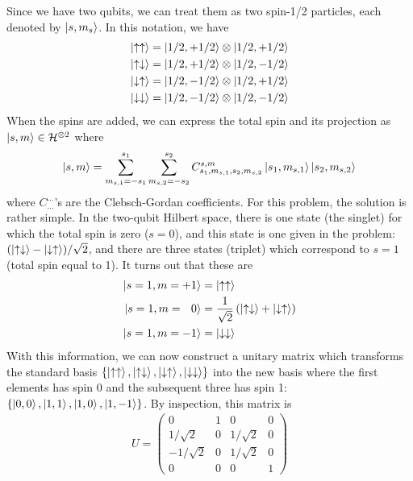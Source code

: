 \documentclass{article}
\theoremstyle{definition}
\newcommand{\f}[2]{\frac{#1}{#2}}
\newcommand{\lp}{\left(}
\newcommand{\rp}{\right)}
\begin{document}
Since we have two qubits, we can treat them as two spin-1/2 particles, each denoted by $\ket{s,m_s}$. In this notation, we have
\begin{align*}
	\ket{\uparrow\uparrow} &= \ket{1/2,+1/2} \otimes \ket{1/2,+1/2}\\
	\ket{\uparrow\downarrow} &= \ket{1/2,+1/2} \otimes \ket{1/2,-1/2}\\
	\ket{\downarrow\uparrow} &= \ket{1/2,-1/2}\otimes \ket{1/2,+1/2}\\
	\ket{\downarrow\downarrow} &= \ket{1/2,-1/2}\otimes \ket{1/2,-1/2}
\end{align*}
When the spins are added, we can express the total spin and its projection as $\ket{s,m}\in \mathcal{H}^{\otimes 2}$ where
\begin{align*}
	\ket{s,m} = \sum_{m_{s,1}=-s_1}^{s_1} \sum_{m_{s,2}=-s_2}^{s_2} C^{s,m}_{s_1,m_{s,1},s_2,m_{s,2}} \ket{s_1,m_{s,1}}\ket{s_2,m_{s,2}}
\end{align*}
where $C^{\dots}_{\dots}$'s are the Clebsch-Gordan coefficients. For this problem, the solution is rather simple. In the two-qubit Hilbert space, there is one state (the singlet) for which the total spin is zero ($s=0$), and this state is one given in the problem: $(\ket{\uparrow\downarrow}- \ket{\downarrow\uparrow})/\sqrt{2}$, and there are three states (triplet) which correspond to $s=1$ (total spin equal to 1). It turns out that these are
\begin{align*}
	\ket{s=1,m=+1} &= \ket{\uparrow\uparrow}\\
	\ket{s=1,m=\,\,\,\,0} &= \f{1}{\sqrt{2}}\lp \ket{\uparrow\downarrow} + \ket{\downarrow\uparrow} \rp\\
	\ket{s=1,m=-1} &= \ket{\downarrow\downarrow}
\end{align*} 
With this information, we can now construct a unitary matrix which transforms the standard basis $\{\ket{\uparrow\uparrow}, \ket{\uparrow\downarrow}, \ket{\downarrow\uparrow}, \ket{\downarrow\downarrow}\}$ into the new basis where the first elements has spin 0 and the subsequent three has spin 1: $\{ \ket{0,0}, \ket{1,1},\ket{1,0},\ket{1,-1} \}$. By inspection, this matrix is 
\begin{align*}
	U = \begin{pmatrix}
		 0 & 1 & 0& 0\\
		 1/\sqrt{2} & 0 & 1/\sqrt{2}& 0\\
		-1/\sqrt{2} & 0 & 1/\sqrt{2}& 0\\
		 0 & 0 & 0& 1
	\end{pmatrix}
\end{align*}
\end{document}
